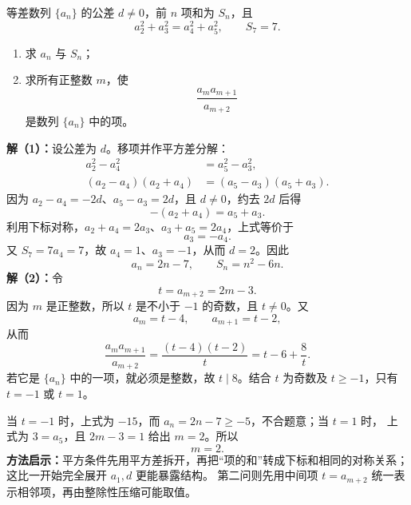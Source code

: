 \begin{examplebox}
  等差数列 $\{a_n\}$ 的公差 $d\ne0$，前 $n$ 项和为 $S_n$，且
  \[
    a_2^2+a_3^2=a_4^2+a_5^2,\qquad S_7=7.
  \]
  \begin{enumerate}
    \item 求 $a_n$ 与 $S_n$；
    \item 求所有正整数 $m$，使
      \[
        \frac{a_m a_{m+1}}{a_{m+2}}
      \]
      是数列 $\{a_n\}$ 中的项。
  \end{enumerate}

  \textbf{解（1）：}设公差为 $d$。移项并作平方差分解：
  \begin{align*}
    a_2^2-a_4^2&=a_5^2-a_3^2,\\
    (a_2-a_4)(a_2+a_4)&=(a_5-a_3)(a_5+a_3).
  \end{align*}
  因为 $a_2-a_4=-2d$、$a_5-a_3=2d$，且 $d\ne0$，约去 $2d$ 后得
  \[
    -(a_2+a_4)=a_5+a_3.
  \]
  利用下标对称，$a_2+a_4=2a_3$、$a_3+a_5=2a_4$，上式等价于
  \[
    a_3=-a_4.
  \]
  又 $S_7=7a_4=7$，故 $a_4=1$、$a_3=-1$，从而 $d=2$。因此
  \[
    \boxed{a_n=2n-7},\qquad
    \boxed{S_n=n^2-6n}.
  \]
  \textbf{解（2）：}令
  \[
    t=a_{m+2}=2m-3.
  \]
  因为 $m$ 是正整数，所以 $t$ 是不小于 $-1$ 的奇数，且 $t\ne0$。又
  \[
    a_m=t-4,\qquad a_{m+1}=t-2,
  \]
  从而
  \[
    \frac{a_ma_{m+1}}{a_{m+2}}
      =\frac{(t-4)(t-2)}t
      =t-6+\frac8t.
  \]
  若它是 $\{a_n\}$ 中的一项，就必须是整数，故 $t\mid8$。结合 $t$ 为奇数及
  $t\ge-1$，只有 $t=-1$ 或 $t=1$。

  当 $t=-1$ 时，上式为 $-15$，而 $a_n=2n-7\ge-5$，不合题意；当 $t=1$ 时，
  上式为 $3=a_5$，且 $2m-3=1$ 给出 $m=2$。所以
  \[
    \boxed{m=2}.
  \]
  \textbf{方法启示：}平方条件先用平方差拆开，再把“项的和”转成下标和相同的对称关系；这比一开始完全展开 $a_1,d$ 更能暴露结构。
  第二问则先用中间项 $t=a_{m+2}$ 统一表示相邻项，再由整除性压缩可能取值。
\end{examplebox}

